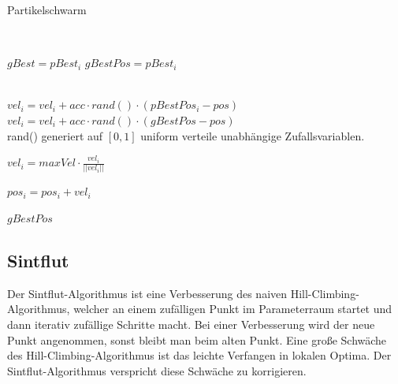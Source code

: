 \documentclass[a4paper,12pt]{article}
\begin{document}
\begin{algorithm}[H]
\caption{Partikelschwarm}
\begin{algorithmic}


 
 
\EndFor

 
\\

	
				\State $gBest = pBest_i$
				\State $gBestPos = pBest_i$
			\EndIf
		\EndIf
	
	\EndFor
	\\
		\State $vel_i = vel_i + acc \cdot rand() \cdot (pBestPos_i - pos)$
		\State $vel_i = vel_i + acc \cdot rand() \cdot (gBestPos - pos)$
		\\\Comment rand() generiert auf $[0,1]$ uniform verteile unabhängige Zufallsvariablen.
		
			\State $vel_i = maxVel \cdot \frac{vel_i}{||vel_i||}$
		\EndIf
		
		\State $pos_i = pos_i + vel_i$
	\EndFor
	
\EndFor

\Return $gBestPos$

\EndFunction
\end{algorithmic}
\end{algorithm}


%

\subsection{Sintflut}

Der Sintflut-Algorithmus ist eine Verbesserung des naiven Hill-Climbing-Algorithmus, welcher an einem zufälligen Punkt im Parameterraum startet und dann iterativ zufällige Schritte macht. Bei einer Verbesserung wird der neue Punkt angenommen, sonst bleibt man beim alten Punkt. Eine große Schwäche des Hill-Climbing-Algorithmus ist das leichte Verfangen in lokalen Optima. Der Sintflut-Algorithmus verspricht diese Schwäche zu korrigieren.
\end{document}
